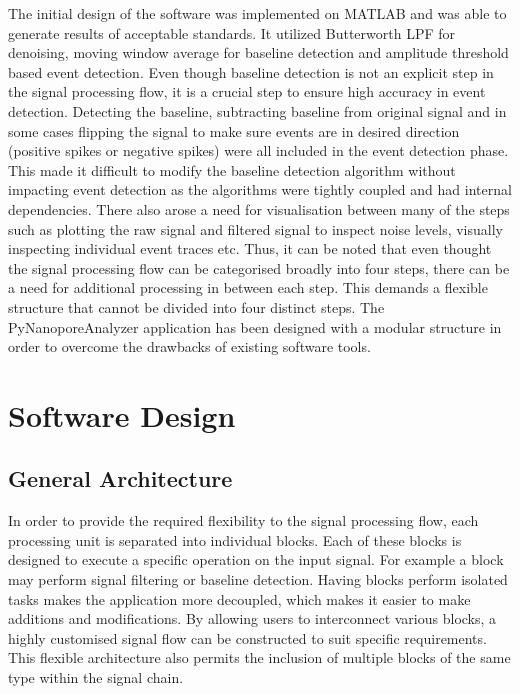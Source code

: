 \documentclass[journal]{IEEEtran}
\begin{document}
The initial design of the software was implemented on MATLAB and was able to generate results of acceptable standards. It utilized Butterworth LPF for denoising, moving window average for baseline detection and amplitude threshold based event detection. Even though baseline detection is not an explicit step in the signal processing flow, it is a crucial step to ensure high accuracy in event detection. Detecting the baseline, subtracting baseline from original signal and in some cases flipping the signal to make sure events are in desired direction (positive spikes or negative spikes) were all included in the event detection phase. This made it difficult to modify the baseline detection algorithm without impacting event detection as the algorithms were tightly coupled and had internal dependencies. There also arose a need for visualisation between many of the steps such as plotting the raw signal and filtered signal to inspect noise levels, visually inspecting individual event traces etc. Thus, it can be noted that even thought the signal processing flow can be categorised broadly into four steps, there can be a need for additional processing in between each step. This demands a flexible structure that cannot be divided into four distinct steps. The PyNanoporeAnalyzer application has been designed with a modular structure in order to overcome the drawbacks of existing software tools.

\section{Software Design}
\subsection{General Architecture}
In order to provide the required flexibility to the signal processing flow, each processing unit is separated into individual blocks. Each of these blocks is designed to execute a specific operation on the input signal. For example a block may perform signal filtering or baseline detection. Having blocks perform isolated tasks makes the application more decoupled, which makes it easier to make additions and modifications. By allowing users to interconnect various blocks, a highly customised signal flow can be constructed to suit specific requirements. This flexible architecture also permits the inclusion of multiple blocks of the same type within the signal chain. 
\end{document}
